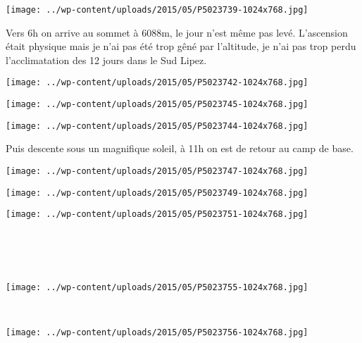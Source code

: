 \begin{center} \texttt{[image: ../wp-content/uploads/2015/05/P5023739-1024x768.jpg]} \end{center}
\vspace{-\topsep}
\vspace{-0.75mm}
\pagebreak

Vers 6h on arrive au sommet à 6088m, le jour n'est même pas levé. L'ascension était physique mais je n'ai pas été trop gêné par l'altitude, je n'ai pas trop perdu l'acclimatation des 12 jours dans le Sud Lipez. 
\begin{center} \texttt{[image: ../wp-content/uploads/2015/05/P5023742-1024x768.jpg]} \end{center}
\begin{center} \texttt{[image: ../wp-content/uploads/2015/05/P5023745-1024x768.jpg]} \end{center}

\begin{center} \texttt{[image: ../wp-content/uploads/2015/05/P5023744-1024x768.jpg]} \end{center}

Puis descente sous un magnifique soleil, à 11h on est de retour au camp de base. 
\begin{center} \texttt{[image: ../wp-content/uploads/2015/05/P5023747-1024x768.jpg]} \end{center}

\begin{center} \texttt{[image: ../wp-content/uploads/2015/05/P5023749-1024x768.jpg]} \end{center}
\vfill
\begin{center} \texttt{[image: ../wp-content/uploads/2015/05/P5023751-1024x768.jpg]} \end{center}
\vspace{-\topsep}
\vspace{-0.75mm}
\pagebreak
~\\~\\~\\
\begin{center} \texttt{[image: ../wp-content/uploads/2015/05/P5023755-1024x768.jpg]} \end{center}
~\\
\begin{center} \texttt{[image: ../wp-content/uploads/2015/05/P5023756-1024x768.jpg]} \end{center}
\vspace{-\topsep}
\pagebreak

